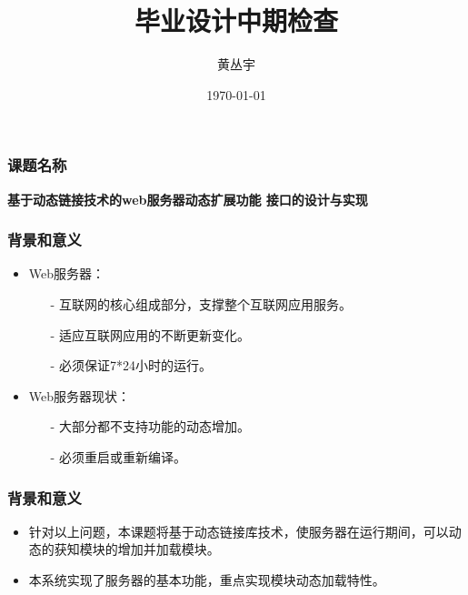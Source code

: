 \documentclass[12pt]{beamer}
\begin{document}
\begin{CJK}{UTF8}{gbsn}	%

\title{毕业设计中期检查}
\author{黄丛宇}
\date{\today}
\frame{\titlepage}

\begin{frame}
	\frametitle{课题名称}
	\begin{center}
	{
	\Large
		\textbf{
			基于动态链接技术的web服务器动态扩展功能%
				接口的设计与实现
		}
	}
	\end{center}
\end{frame}

\begin{frame}
	\frametitle{背景和意义}
	\begin{itemize}
		\item Web服务器：
			\begin{itemize}
				\item[-] 互联网的核心组成部分，支撑整个互联网应用服务。
				\item[-] 适应互联网应用的不断更新变化。
				\item[-] 必须保证7*24小时的运行。
			\end{itemize}
		\pause
		\item Web服务器现状：
			\begin{itemize}
				\item[-] 大部分都不支持功能的动态增加。
				\item[-] 必须重启或重新编译。
			\end{itemize}
	\end{itemize}
\end{frame}

\begin{frame}
	\frametitle{背景和意义}
	\begin{itemize}
		\item 针对以上问题，本课题将基于动态链接库技术，使服务器在运行期间，可以动态的获知模块的增加并加载模块。
		\pause
		\item 本系统实现了服务器的基本功能，重点实现模块动态加载特性。
	\end{itemize}
\end{frame}


\end{CJK}
\end{document}

